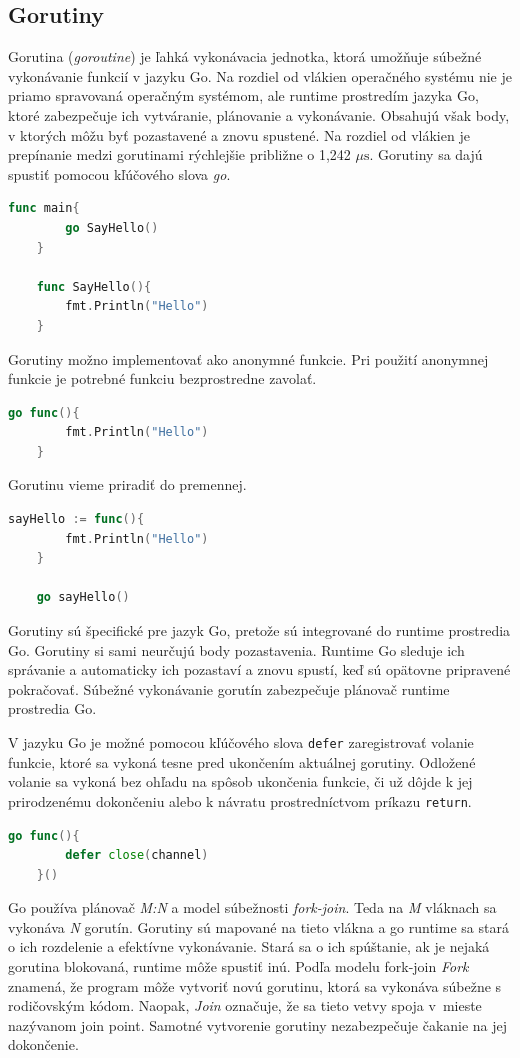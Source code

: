 \documentclass[
  biblatex,
  seconds=true,
  language=slovak,
  figures=false,
  urldate=iso,
  glossaries,
  index
]{kidiplom}
\begin{document}
\subsection{Gorutiny}
Gorutina (\emph{goroutine}) je ľahká vykonávacia jednotka, ktorá umožňuje súbežné vykonávanie funkcií v jazyku Go. Na rozdiel od vlákien operačného systému nie je priamo spravovaná operačným systémom, ale runtime prostredím jazyka Go, ktoré zabezpečuje ich vytváranie, plánovanie a vykonávanie. Obsahujú však body, v ktorých môžu byť pozastavené a znovu spustené.
Na rozdiel od vlákien je prepínanie medzi gorutinami rýchlejšie približne o 1,242 $\mu\text{s}$.\cite{cox2017}
Gorutiny sa dajú spustiť pomocou kľúčového slova \emph{go}. 
\begin{lstlisting}[language=Go]
	func main{
		go SayHello()
	}

	func SayHello(){
		fmt.Println("Hello")
	}
\end{lstlisting}
Gorutiny možno implementovať ako anonymné funkcie. Pri použití anonymnej funkcie je potrebné funkciu bezprostredne zavolať. 
\begin{lstlisting}[language=Go]
	go func(){
		fmt.Println("Hello")
	}
\end{lstlisting}
Gorutinu vieme priradiť do premennej.
\begin{lstlisting}[language=Go]
	sayHello := func(){
		fmt.Println("Hello")
	}

	go sayHello()
\end{lstlisting}
Gorutiny sú špecifické pre jazyk Go, pretože sú integrované do runtime prostredia Go.
Gorutiny si sami neurčujú body pozastavenia. Runtime Go sleduje ich správanie a
automaticky ich pozastaví a znovu spustí, keď sú opätovne pripravené pokračovať.
Súbežné vykonávanie gorutín zabezpečuje plánovač runtime prostredia Go. \cite{baugh2010go}

V jazyku Go je možné pomocou kľúčového slova \texttt{defer} zaregistrovať volanie funkcie, ktoré sa vykoná tesne pred ukončením aktuálnej gorutiny. Odložené volanie sa vykoná bez ohľadu na spôsob ukončenia funkcie, či už dôjde k jej prirodzenému dokončeniu alebo k návratu prostredníctvom príkazu \texttt{return}.
\begin{lstlisting}[language=Go]
	go func(){
		defer close(channel)
	}()
\end{lstlisting}

Go používa plánovač \emph{M:N} a model súbežnosti \emph{fork-join}.\cite{cox2017}
Teda na \emph{M} vláknach sa vykonáva \emph{N} gorutín. Gorutiny
sú mapované na tieto vlákna a go runtime sa stará o ich rozdelenie a efektívne vykonávanie. Stará sa o ich spúštanie,
ak je nejaká gorutina blokovaná, runtime môže spustiť inú.
Podľa modelu fork-join \emph{Fork} znamená, že program môže vytvoriť novú
gorutinu, ktorá sa vykonáva súbežne s rodičovským kódom. Naopak, \emph{Join} označuje, že sa tieto vetvy spoja v~mieste nazývanom
join point.
Samotné vytvorenie gorutiny nezabezpečuje čakanie na jej dokončenie.
\end{document}
